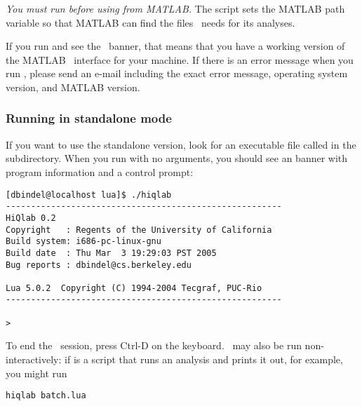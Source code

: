 \emph{You must run  before using \hiq from MATLAB.}  The
 script sets the MATLAB path variable so that MATLAB can
find the files \hiq\ needs for its analyses.

If you run  and see the \hiq\ banner, that means that you
have a working version of the MATLAB \hiq\ interface for your
machine.  If there is an error message when you run ,
please send an e-mail including the exact error message, operating
system version, and MATLAB version.


\subsubsection{Running in standalone mode}

If you want to use the standalone version, look for an executable file
called  in the  subdirectory.  When you
run  with no arguments, you should see an banner with
program information and a control prompt:
\begin{verbatim}
[dbindel@localhost lua]$ ./hiqlab
-------------------------------------------------------
HiQlab 0.2
Copyright   : Regents of the University of California
Build system: i686-pc-linux-gnu
Build date  : Thu Mar  3 19:29:03 PST 2005
Bug reports : dbindel@cs.berkeley.edu
 
Lua 5.0.2  Copyright (C) 1994-2004 Tecgraf, PUC-Rio
-------------------------------------------------------
 
>
\end{verbatim}%
To end the \hiq\ session, press Ctrl-D on the keyboard.  \hiq\ may
also be run non-interactively: if  is a script that
runs an analysis and prints it out, for example, you might run
\begin{verbatim}
hiqlab batch.lua
\end{verbatim}

